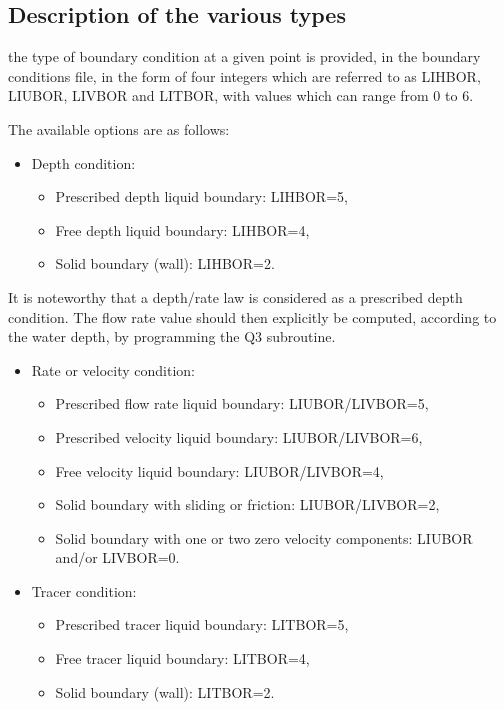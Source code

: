 \subsection{Description of the various types}

the type of boundary condition at a given point is provided, in the boundary
conditions file, in the form of four integers which are referred to as
LIHBOR, LIUBOR, LIVBOR and LITBOR, with values which
can range from 0 to 6.

The available options are as follows:

\begin{itemize}
\item Depth condition:

\begin{itemize}
\item Prescribed depth liquid boundary: LIHBOR=5,

\item Free depth liquid boundary: LIHBOR=4,

\item Solid boundary (wall): LIHBOR=2.
\end{itemize}
\end{itemize}

It is noteworthy that a depth/rate law is considered as a prescribed depth
condition. The flow rate value should then explicitly be computed, according to
the water depth, by programming the Q3 subroutine.

\begin{itemize}
\item Rate or velocity condition:

\begin{itemize}
\item Prescribed flow rate liquid boundary: LIUBOR/LIVBOR=5,

\item Prescribed velocity liquid boundary: LIUBOR/LIVBOR=6,

\item Free velocity liquid boundary: LIUBOR/LIVBOR=4,

\item Solid boundary with sliding or friction: LIUBOR/LIVBOR=2,

\item Solid boundary with one or two zero velocity components: LIUBOR and/or
LIVBOR=0.
\end{itemize}

\item Tracer condition:

\begin{itemize}
\item Prescribed tracer liquid boundary: LITBOR=5,

\item Free tracer liquid boundary: LITBOR=4,

\item Solid boundary (wall): LITBOR=2.
\end{itemize}
\end{itemize}


